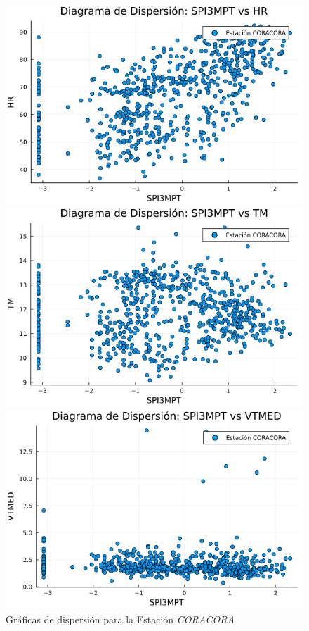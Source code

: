 \begin{figure}[htbp]
\centering
\caption{Gráficas de dispersión para la Estación \textit{CORACORA}}
\begin{minipage}{0.32\textwidth}
    \centering
    \includegraphics[width=\linewidth]{Capitulos/Scaterplot/CORACORA_SPI3MPT_vs_HR.png}
\end{minipage}\hfill
\begin{minipage}{0.32\textwidth}
    \centering
    \includegraphics[width=\linewidth]{Capitulos/Scaterplot/CORACORA_SPI3MPT_vs_TM.png}
\end{minipage}\hfill
\begin{minipage}{0.32\textwidth}
    \centering
    \includegraphics[width=\linewidth]{Capitulos/Scaterplot/CORACORA_SPI3MPT_vs_VTMED.png}

\end{minipage}
\end{figure}
